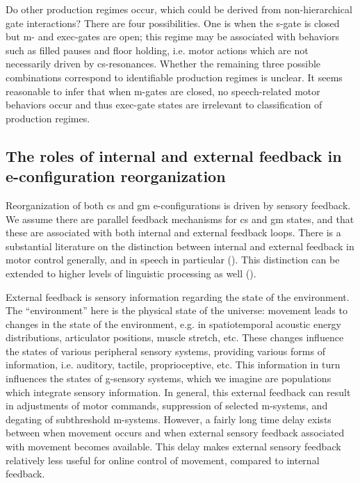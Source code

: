   Do other production regimes occur, which could  be derived from non-hierarchical gate interactions? There are four possibilities. One is when the s-gate is closed but m- and exec-gates are open; this regime may be associated with behaviors such as filled pauses and floor holding, i.e. motor actions which are not necessarily driven by cs-resonances. Whether the remaining three possible combinations correspond to identifiable production regimes is unclear. It seems reasonable to infer that when m-gates are closed, no speech-related motor behaviors occur and thus exec-gate states are irrelevant to classification of production regimes.

\subsection{The roles of internal and external feedback in e-configuration reorganization}

Reorganization of both cs and gm e-configurations is driven by sensory feedback. We assume there are parallel feedback mechanisms for cs and gm states, and that these are associated with both internal and external feedback loops. There is a substantial literature on the distinction between internal and external feedback in motor control generally, and in speech in particular (\citealt{Hickok2012,Kawato1999,MiallWolpert1996,RamanarayananEtAl2016,WolpertEtAl1995,WolpertKawato1998}). This distinction can be extended to higher levels of linguistic processing as well (\citealt{HagoortLevelt2009,Laver1973,Levelt1983,Levelt1989,Nooteboom1973,NooteboomQuené2008,Postma2000}).

  External feedback is sensory information regarding the state of the environment. The “environment” here is the physical state of the universe: movement leads to changes in the state of the environment, e.g. in spatiotemporal acoustic energy distributions, articulator positions, muscle stretch, etc. These changes influence the states of various peripheral sensory systems, providing various forms of information, i.e. auditory, tactile, proprioceptive, etc. This information in turn influences the states of g-sensory systems, which we imagine are populations which integrate sensory information. In general, this external feedback can result in adjustments of motor commands, suppression of selected m-systems, and degating of subthreshold m-systems. However, a fairly long time delay exists between when movement occurs and when external sensory feedback associated with movement becomes available. This delay makes external sensory feedback relatively less useful for online control of movement, compared to internal feedback. 

